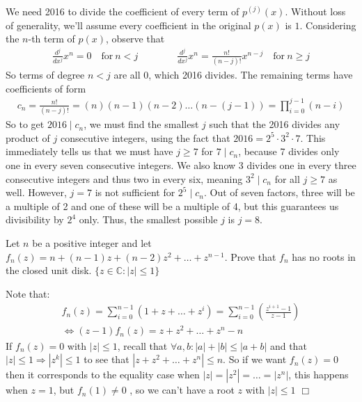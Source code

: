 \begin{solution}[8]
    We need 2016 to divide the coefficient of every term of $p^{(j)}(x)$. Without loss of generality, we'll assume every coefficient in the original $p(x)$ is $1$. Considering the $n$-th term of $p(x)$, observe that
    \begin{align*}
        \frac{d^j}{dx^j}x^n = 0 \quad \text{for}\ n < j \qquad \qquad \frac{d^j}{dx^j}x^n = \frac{n!}{(n-j)!}x^{n-j} \quad \text{for}\ n \geq j
    \end{align*}
    So terms of degree $n<j$ are all $0$, which 2016 divides. The remaining terms have coefficients of form
    \begin{align*}
        c_n = \frac{n!}{(n-j)!} = (n)(n-1)(n-2)\dots(n-(j-1)) = \prod_{i=0}^{j-1}(n-i)
    \end{align*}
    So to get $2016 \mid c_n$, we must find the smallest $j$ such that the 2016 divides any product of $j$ consecutive integers, using the fact that $2016 = 2^5 \cdot 3^2 \cdot 7$. This immediately tells us that we must have $j \geq 7$ for $7 \mid c_n$, because 7 divides only one in every seven consecutive integers. We also know 3 divides one in every three consecutive integers and thus two in every six, meaning $3^2 \mid c_n$ for all $j \geq 7$ as well. However, $j = 7$ is not sufficient for $2^5 \mid c_n$. Out of seven factors, three will be a multiple of 2 and one of these will be a multiple of 4, but this guarantees us divisibility by $2^4$ only. Thus, the smallest possible $j$ is $j =\boxed{8}$.
\end{solution}

\begin{problem}[R][7][Putnam 2018 /B2]
    Let $n$ be a positive integer and let $f_n(z)=n+(n-1)z+(n-2)z^2+\ldots+z^{n-1}$. Prove that $f_n$ has no roots in the closed unit disk. $\{z \in \mathbb{C}:|z| \leq 1 \}$
\end{problem}

\begin{solution}
    Note that:
    \begin{align*}
        f_n(z)=\sum_{i=0}^{n-1}(1+z+\ldots+z^i) = \sum_{i=0}^{n-1}\left(\frac{z^{i+1}-1}{z-1}\right)\\
        \iff (z-1)f_n(z)=z+z^2+\ldots+z^n-n
    \end{align*}
    If $f_n(z)=0$ with $|z|\leq 1$, recall that $\forall a,b :|a|+|b|\leq|a+b|$ and that $|z|\leq 1 \Rightarrow|z^k| \leq 1$ to see that $|z+z^2+\ldots+z^n| \leq n$. So if we want $f_n(z)=0$ then it corresponds to the equality case when $|z|=|z^2|=\ldots=|z^n|$, this happens when $z=1$, but $f_n(1) \neq 0$ , so we can't have a root $z$ with $|z| \leq 1$ $\Box$
\end{solution}

